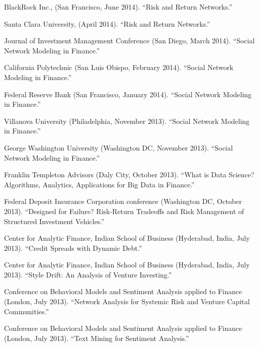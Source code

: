 \documentclass{article}
\begin{document}
\begin{etaremune}
{\item BlackRock Inc., (San Francisco, June 2014). ``Risk and Return Networks.''

\item Santa Clara University, (April 2014). ``Risk and Return Networks.'' 

\item Journal of Investment Management Conference (San Diego, March 2014). ``Social Network Modeling in Finance.'' 

\item California Polytechnic (San Luis Obispo, February 2014). ``Social Network Modeling in Finance.'' 

\item Federal Reserve Bank (San Francisco, January 2014). ``Social Network Modeling in Finance.'' 

\item Villanova University (Philadelphia, November 2013). ``Social Network Modeling in Finance.'' 

\item George Washington University (Washington DC, November 2013). ``Social Network Modeling in Finance.'' 

\item Franklin Templeton Advisors (Daly City, October 2013). ``What is Data Science? Algorithms, Analytics, Applications for Big Data in Finance.'' 

\item Federal Deposit Insurance Corporation conference (Washington DC, October 2013). ``Designed for Failure? Risk-Return Tradeoffs and Risk Management of Structured Investment Vehicles.''

\item Center for Analytic Finance, Indian School of Business (Hyderabad, India, July 2013). ``Credit Spreads with Dynamic Debt.''

\item Center for Analytic Finance, Indian School of Business (Hyderabad, India, July 2013). ``Style Drift: An Analysis of Venture Investing.''

\item Conference on Behavioral Models and Sentiment Analysis applied to Finance (London, July 2013). ``Network Analysis for Systemic Risk and Venture Capital Communities.'' 

\item Conference on Behavioral Models and Sentiment Analysis applied to Finance (London, July 2013). ``Text Mining for Sentiment Analysis.'' 

}
\end{etaremune}
\end{document}
